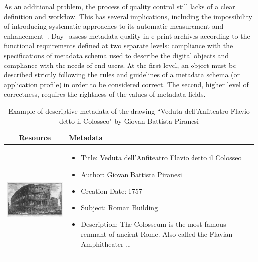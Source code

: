 \documentclass[epsfig,a4paper,12pt,titlepage]{book}
\begin{document}
  As an additional problem, the process of quality control still lacks of a clear definition and workflow. This has several implications, including the impossibility of introducing systematic approaches to its automatic measurement and enhancement~\cite{38}. 
 Day~\cite{35} assess metadata quality in e-print archives according to the functional requirements defined at two separate levels: compliance with the specifications of metadata schema used to describe the digital objects and compliance with the needs of end-users. At the first level, an object must be described strictly following the rules and guidelines of a  metadata schema (or application profile) in order to be considered correct. The second, higher level of correctness, requires the rightness of the values of metadata fields. 
 
 \begin{table}[h!]
  \centering
  \begin{tabular}{ | c | m{10cm} | }
    \hline
    Resource & Metadata  \\ \hline
    \begin{minipage}{.3\textwidth}
      \includegraphics[width=\linewidth, height=30mm]{colosseo.png}
    \end{minipage}
    &
      \begin{itemize}
        \item Title: Veduta dell'Anfiteatro Flavio detto il Colosseo
        \item Author: Giovan Battista Piranesi
        \item Creation Date: 1757
        \item Subject: Roman Building
        \item Description: The Colosseum is the most famous remnant of ancient Rome. Also called the Flavian Amphitheater \dots
      \end{itemize}
    
    \\ \hline
  \end{tabular}
  \caption{Example of descriptive metadata of the drawing ``Veduta dell'Anfiteatro Flavio detto il Colosseo" by Giovan Battista Piranesi}\label{tbl:2}
\end{table}
 
\end{document}
